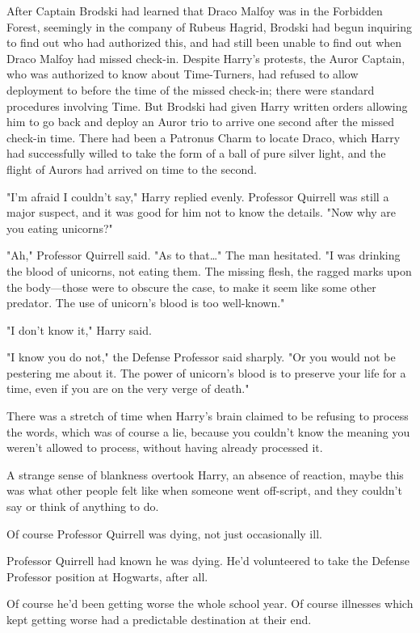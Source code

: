 After Captain Brodski had learned that Draco Malfoy was in the Forbidden
Forest, seemingly in the company of Rubeus Hagrid, Brodski had begun inquiring
to find out who had authorized this, and had still been unable to find out when
Draco Malfoy had missed check-in. Despite Harry's protests, the Auror Captain,
who was authorized to know about Time-Turners, had refused to allow deployment
to before the time of the missed check-in; there were standard procedures
involving Time. But Brodski had given Harry written orders allowing him to go
back and deploy an Auror trio to arrive one second after the missed check-in
time. There had been a Patronus Charm to locate Draco, which Harry had
successfully willed to take the form of a ball of pure silver light, and the
flight of Aurors had arrived on time to the second.

"I'm afraid I couldn't say," Harry replied evenly. Professor Quirrell was still
a major suspect, and it was good for him not to know the details. "Now why are
you eating unicorns?"

"Ah," Professor Quirrell said. "As to that…" The man hesitated. "I was drinking
the blood of unicorns, not eating them. The missing flesh, the ragged marks
upon the body---those were to obscure the case, to make it seem like some other
predator. The use of unicorn's blood is too well-known."

"I don't know it," Harry said.

"I know you do not," the Defense Professor said sharply. "Or you would not be
pestering me about it. The power of unicorn's blood is to preserve your life
for a time, even if you are on the very verge of death."

There was a stretch of time when Harry's brain claimed to be refusing to
process the words, which was of course a lie, because you couldn't know the
meaning you weren't allowed to process, without having already processed it.

A strange sense of blankness overtook Harry, an absence of reaction, maybe this
was what other people felt like when someone went off-script, and they couldn't
say or think of anything to do.

Of course Professor Quirrell was dying, not just occasionally ill.

Professor Quirrell had known he was dying. He'd volunteered to take the Defense
Professor position at Hogwarts, after all.

Of course he'd been getting worse the whole school year. Of course illnesses
which kept getting worse had a predictable destination at their end.

